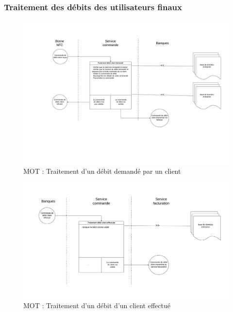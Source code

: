 \subsubsection{Traitement des débits des utilisateurs finaux}
\begin{landscape}
  \begin{figure}[ht!]
      \centering
      \includegraphics[width=0.7\paperheight]{mot-traitement-debit-client}
      \caption{MOT : Traitement d'un débit demandé par un client}
      \label{fig:mot-traitement-debit-client}
  \end{figure}
\end{landscape}

\begin{landscape}
  \begin{figure}[ht!]
      \centering
      \includegraphics[width=0.7\paperheight]{mot-traitement-debit-client-effectue}
      \caption{MOT : Traitement d'un débit d'un client effectué}
      \label{fig:mot-traitement-debit-client-effectue}
  \end{figure}
\end{landscape}

